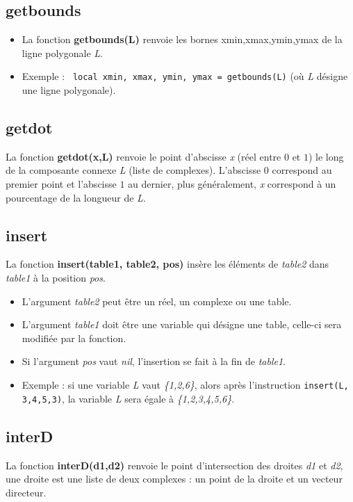 \subsection{getbounds}
\begin{itemize}
    \item La fonction \textbf{getbounds(L)} renvoie les bornes xmin,xmax,ymin,ymax de la ligne polygonale \emph{L}.
    \item Exemple : \texttt{ local xmin, xmax, ymin, ymax = getbounds(L)} (où \emph{L} désigne une ligne polygonale).
\end{itemize}

\subsection{getdot}
La fonction \textbf{getdot(x,L)} renvoie le point d'abscisse \emph{x} (réel entre $0$ et $1$) le long de la composante connexe \emph{L} (liste de complexes). L'abscisse $0$ correspond au premier point et l'abscisse $1$ au dernier, plus généralement, \emph{x} correspond à un pourcentage de la longueur de \emph{L}.

\subsection{insert}
La fonction \textbf{insert(table1, table2, pos)} insère les éléments de \emph{table2} dans \emph{table1} à la position \emph{pos}.

\begin{itemize}
    \item L'argument \emph{table2} peut être un réel, un complexe ou une table.
    \item L'argument \emph{table1} doit être une variable qui désigne une table, celle-ci sera modifiée par la fonction.
    \item Si l'argument \emph{pos} vaut \emph{nil}, l'insertion se fait à la fin de \emph{table1}.
    \item Exemple : si une variable \emph{L} vaut \emph{\{1,2,6\}}, alors après l'instruction \texttt{insert(L, {3,4,5},3)}, la variable \emph{L} sera égale à \emph{\{1,2,3,4,5,6\}}.
\end{itemize}

\subsection{interD}
La fonction \textbf{interD(d1,d2)} renvoie le point d'intersection des droites \emph{d1} et \emph{d2}, une droite est une liste de deux complexes : un point de la droite et un vecteur directeur.

